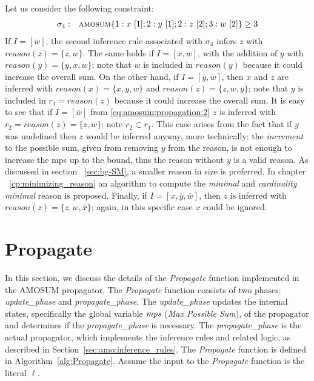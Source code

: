 \begin{example}\label{ex:amosum:propagation:more-2}
    Let us consider the following constraint:
    \begin{align*}
    \begin{array}{rl}
        \sigma_{4}: & \textsc{amosum}\{
            1 : x\ [1]; 2 : y\ [1]; 2 : z\ [2]; 3 : w\ [2]
        \} \geq 3
    \end{array}
    \end{align*}
    If $I = [\overline{w}]$, the second inference rule associated with $\sigma_4$ infers $z$ with $\mathit{reason}(z) = \{z, w\}$.
    The same holds if $I = [\overline{x}, \overline{w}]$, with the addition of $y$ with $\mathit{reason}(y) = \{y, x, w\}$;
    note that $w$ is included in $\mathit{reason}(y)$ because it could increase the overall sum.
    On the other hand, if $I = [\overline{y}, \overline{w}]$, then $x$ and $z$ are inferred with 
    $\mathit{reason}(x) = \{x, y, w\}$ and
    $\mathit{reason}(z) = \{z, w, y\}$;
    note that $y$ is included in $r_1 = \mathit{reason}(z)$ because it could increase the overall sum. 
    It is easy to see that if $I = [\overline{w}]$
    from \eqref{eq:amosum:propagation:2} $z$ is inferred with $r_2 = \mathit{reason}(z) = \{z, w\}$;
    note $r_2 \subset r_1$. This case arises from the fact that if $y$ was undefined then 
    $z$ would be inferred anyway, more technically: the \textit{increment} to the possible 
    sum, given from removing $y$ from the reason, is not enough to increase the mps up to the bound, thus 
    the reason without $y$ is a valid reason.
    As discussed in section ~\ref{sec:bg-SM}, a smaller reason in size is preferred.
    In chapter ~\ref{cp:minimizing_reason} an algorithm to compute the \textit{minimal} and 
    \textit{cardinality minimal} reason is proposed.
    Finally, if $I = [x, \overline{y}, \overline{w}]$, then $z$ is inferred with $\mathit{reason}(z) = \{z, w, \overline{x}\}$;
    again, in this specific case $x$ could be ignored.
    \end{example}
    

\section{Propagate}
\label{sec:amo:propagator}

In this section, we discuss the details of the \textit{Propagate} function implemented in the AMOSUM propagator.
The \textit{Propagate} function consists of two phases: \textit{update\_phase} and \textit{propagate\_phase}.
The \textit{update\_phase} updates the internal states, specifically the global variable $\mathit{mps}$ (\textit{Max Possible Sum}), 
of the propagator and determines if the \textit{propagate\_phase} is necessary. 
The \textit{propagate\_phase} is the actual propagator, which implements the inference 
rules and related logic, as described in Section~\ref{sec:amo:inference_rules}.
The \textit{Propagate} function is defined in Algorithm~\ref{alg:Propagate}.
Assume the input to the \textit{Propagate} function is the literal $\ell$.

